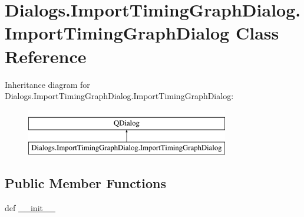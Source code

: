 \hypertarget{classDialogs_1_1ImportTimingGraphDialog_1_1ImportTimingGraphDialog}{\section{Dialogs.\-Import\-Timing\-Graph\-Dialog.\-Import\-Timing\-Graph\-Dialog Class Reference}
\label{classDialogs_1_1ImportTimingGraphDialog_1_1ImportTimingGraphDialog}
}
Inheritance diagram for Dialogs.\-Import\-Timing\-Graph\-Dialog.\-Import\-Timing\-Graph\-Dialog\-:\begin{figure}[H]
\begin{center}
\leavevmode
\includegraphics[height=2.000000cm]{classDialogs_1_1ImportTimingGraphDialog_1_1ImportTimingGraphDialog}
\end{center}
\end{figure}
\subsection*{Public Member Functions}
\begin{DoxyCompactItemize}
\item 
def \hyperlink{classDialogs_1_1ImportTimingGraphDialog_1_1ImportTimingGraphDialog_a851c120fd40562ddf2e19db9d86555d1}{\-\_\-\-\_\-init\-\_\-\-\_\-}
\end{DoxyCompactItemize}
